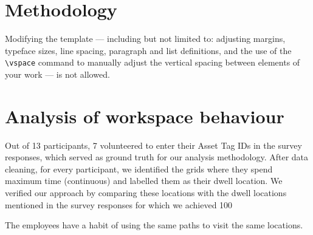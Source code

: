 \documentclass[acmtog]{acmart}
\begin{document}
\section{Methodology}

Modifying the template --- including but not limited to: adjusting
margins, typeface sizes, line spacing, paragraph and list definitions,
and the use of the \verb|\vspace| command to manually adjust the
vertical spacing between elements of your work --- is not allowed.






\section{Analysis of workspace behaviour}
Out of 13 participants, 7 volunteered to enter their Asset Tag IDs in the survey responses, which served as ground truth for our analysis methodology. After data cleaning, for every participant, we identified the grids where they spend maximum time (continuous) and labelled them as their dwell location. We verified our approach by comparing these locations with the dwell locations mentioned in the survey responses for which we achieved 100%

The employees have a habit of using the same paths to visit the same locations. 
\end{document}
